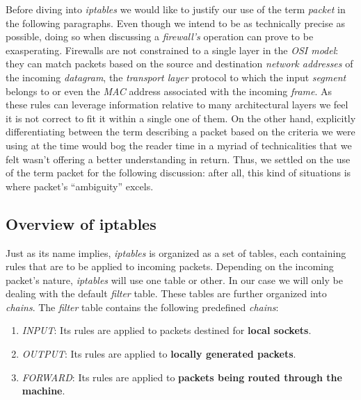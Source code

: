         Before diving into \textit{iptables} we would like to justify our use of the term \textit{packet} in the following paragraphs. Even though we intend to be as technically precise as possible, doing so when discussing a \textit{firewall's} operation can prove to be exasperating. Firewalls are not constrained to a single layer in the \textit{OSI model}: they can match packets based on the source and destination \textit{network addresses} of the incoming \textit{datagram}, the \textit{transport layer} protocol to which the input \textit{segment} belongs to or even the \textit{MAC} address associated with the incoming \textit{frame}. As these rules can leverage information relative to many architectural layers we feel it is not correct to fit it within a single one of them. On the other hand, explicitly differentiating between the term describing a packet based on the criteria we were using at the time would bog the reader time in a myriad of technicalities that we felt wasn't offering a better understanding in return. Thus, we settled on the use of the term packet for the following discussion: after all, this kind of situations is where packet's ``ambiguity'' excels.\\

        \subsection{Overview of iptables}
            Just as its name implies, \textit{iptables} is organized as a set of tables, each containing rules that are to be applied to incoming packets. Depending on the incoming packet's nature, \textit{iptables} will use one table or other. In our case we will only be dealing with the default \textit{filter} table. These tables are further organized into \textit{chains}. The \textit{filter} table contains the following predefined \textit{chains}:\\

            \begin{enumerate}
                \item \textit{INPUT}: Its rules are applied to packets destined for \textbf{local sockets}.
                \item \textit{OUTPUT}: Its rules are applied to \textbf{locally generated packets}.
                \item \textit{FORWARD}: Its rules are applied to \textbf{packets being routed through the machine}.
            \end{enumerate}

